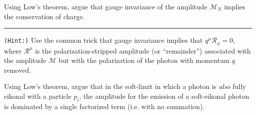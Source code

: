 \begin{exercise}
    Using Low's  theorem, argue that gauge invariance of the amplitude \(\mathcal{M}_N\) implies the conservation of charge.

    \vspace{7pt}
    \hrule
    \vspace{7pt}

    \texttt{(Hint:)}
    Use the common trick that gauge invariance implies that \(q^\mu \mathcal{R}_\mu = 0\), where \(\mathcal{R}^\mu\) is the polarization-stripped amplitude (or ``remainder'') associated with the amplitude \(\mathcal{M}\) but with the polarization of the photon with momentum \(q\) removed.
\end{exercise}

\begin{exercise}
    \label{ex:soft-eikonal-photon}
    Using Low's theorem, argue that in the \gls{soft-limit} in which a photon is \textit{also} fully eikonal with a particle \(p_i\), the amplitude for the emission of a soft-eikonal photon is dominated by a single factorized term (i.e. with no summation).
\end{exercise}




